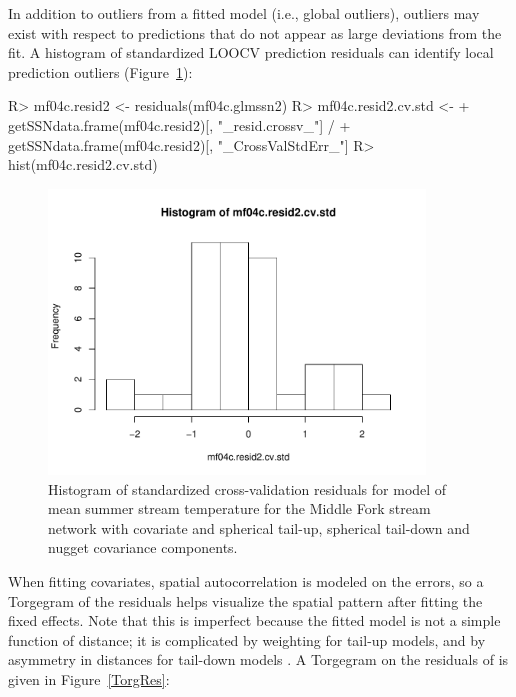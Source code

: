 \documentclass[nojss]{jss}
\renewenvironment{Schunk}{\vspace{\topsep}}{\vspace{\topsep}}
\begin{document}
In addition to outliers from a fitted model (i.e., global outliers),
outliers may exist with respect to predictions that do not appear as
large deviations from the fit.  A histogram of standardized LOOCV
prediction residuals can identify local prediction outliers
(Figure~\ref{Residuals}):

\begin{Schunk}
\begin{Sinput}
R> mf04c.resid2 <- residuals(mf04c.glmssn2)
R> mf04c.resid2.cv.std <-
+      getSSNdata.frame(mf04c.resid2)[, "_resid.crossv_"] /
+      getSSNdata.frame(mf04c.resid2)[, "_CrossValStdErr_"]
R> hist(mf04c.resid2.cv.std)
\end{Sinput}
\end{Schunk}

\begin{figure}[htbp]
  \begin{center}
    \includegraphics[keepaspectratio=true, width = 100mm]{Figures/jss984Fig-Residuals}
    \caption{Histogram of standardized cross-validation residuals for
      model  of mean summer stream temperature for the Middle Fork
      stream network with  covariate and spherical tail-up, spherical tail-down and nugget covariance components.\label{Residuals}}
  \end{center}
\end{figure}

When fitting covariates, spatial autocorrelation is modeled on the
errors, so a Torgegram of the residuals helps visualize the spatial
pattern after fitting the fixed effects.  Note that this is imperfect
because the fitted model is not a simple function of distance; it is
complicated by weighting for tail-up models, and by asymmetry in
distances for tail-down models \citep[see][Figure
7]{Ver:Pete:Move:2010}. A Torgegram on the residuals of
 is given in Figure~\ref{TorgRes}:
\end{document}
